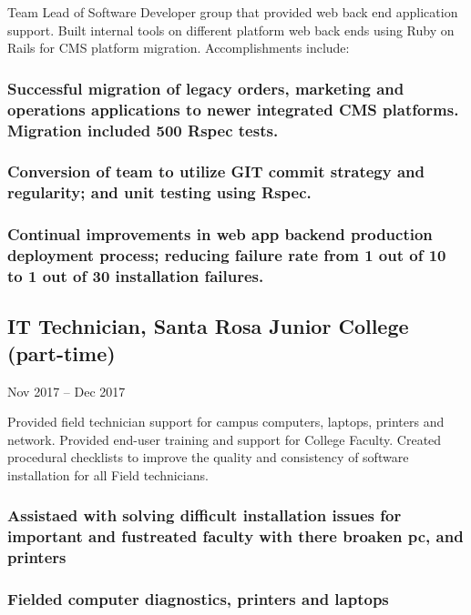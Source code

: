 \documentclass{article}
\begin{document}
        \vspace{0mm}
        Team Lead of Software Developer group that provided web back end application support. Built internal tools on different platform web back ends using Ruby on Rails for CMS platform migration. Accomplishments include:

        \vspace{-2mm}
        \subsubsection{Successful migration of legacy orders, marketing and operations applications to newer integrated CMS platforms. Migration included 500 Rspec tests.}
        \subsubsection{Conversion of team to utilize GIT commit strategy and regularity; and unit testing using Rspec.}
        \subsubsection{Continual improvements in web app backend production deployment process; reducing failure rate from 1 out of 10 to 1 out of 30 installation failures.}
        
    \subsection{IT Technician, Santa Rosa Junior College (part-time)}Nov 2017 – Dec 2017
        
        \vspace{0mm}
        Provided field technician support for campus computers, laptops, printers and network. Provided end-user training and support for College Faculty. Created procedural checklists to improve the quality and consistency of software installation for all Field technicians.

        \vspace{-2mm}
    	\subsubsection{Assistaed with solving difficult installation issues for important and fustreated faculty with there broaken pc, and printers  }
    	\subsubsection{Fielded computer diagnostics, printers and laptops }
\end{document}

